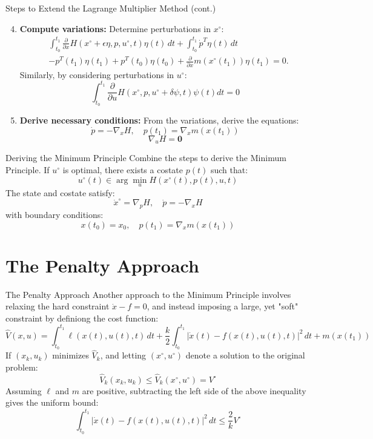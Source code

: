 \documentclass[10pt]{beamer}
\begin{document}
\begin{frame}{Steps to Extend the Lagrange Multiplier Method (cont.)}
  \begin{enumerate}
    \setcounter{enumi}{3}
    \item \textbf{Compute variations:} Determine perturbations in \(x^{\circ}\):
    \[
    \begin{aligned}
      &\int_{t_0}^{t_1} \frac{\partial}{\partial x} H(x^\circ + \epsilon \eta, p, u^\circ, t) \eta(t) \, dt + \int_{t_0}^{t_1} \dot{p}^T \eta(t) \, dt \\
      &- p^T(t_1) \eta(t_1) + p^T(t_0) \eta(t_0) + \frac{\partial}{\partial x} m(x^\circ(t_1)) \eta(t_1) = 0.
    \end{aligned}
    \]
    Similarly, by considering perturbations in \( u^{\circ} \):
    \[
       \int_{t_0}^{t_1}\frac{\partial}{\partial u}H(x^{\circ},p,u^{\circ}+\delta \psi,t)\psi(t)dt=0
    \]
    \item \textbf{Derive necessary conditions:} From the variations, derive the equations:
    \[
    \dot{p} = -\nabla_x H, \quad p(t_1) = \nabla_x m(x(t_1))
    \]
    \[
    \nabla_u H = \mathbf{0}
    \]
\end{enumerate}
\end{frame}

\begin{frame}{Deriving the Minimum Principle}
  Combine the steps to derive the Minimum Principle. If \( u^\circ \) is optimal, there exists a costate \( p(t) \) such that:
  \[
  u^\circ(t) \in \arg \min_u H(x^\circ(t), p(t), u, t)
  \]
  The state and costate satisfy:
  \[
  \dot{x}^\circ = \nabla_p H, \quad \dot{p} = -\nabla_x H
  \]
  with boundary conditions:
  \[
  x(t_0) = x_0, \quad p(t_1) = \nabla_x m(x(t_1))
  \]
\end{frame}
  
\section{The Penalty Approach}
  
\begin{frame}[fragile]{The Penalty Approach}
  Another approach to the Minimum Principle involves relaxing the hard constraint \( \dot{x} - f = 0 \), and instead imposing a large, yet "soft" constraint by  definiong the cost function:
  \[
  \hat{V}(x, u) = \int_{t_0}^{t_1} \ell(x(t), u(t), t) \, dt + \frac{k}{2} \int_{t_0}^{t_1} |\dot{x}(t) - f(x(t), u(t), t)|^2 \, dt + m(x(t_1))
  \]
  If \( (x_k, u_k) \) minimizes \( \hat{V}_k \), and letting \( (x^\circ, u^\circ) \) denote a solution to the original problem:
  \[
  \hat{V}_k(x_k, u_k) \leq \hat{V}_k(x^\circ, u^\circ) = V^\circ
  \]
  Assuming \( \ell \) and \( m \) are positive, subtracting the left side of the above inequality gives the uniform bound:
  \[
  \int_{t_0}^{t_1} |\dot{x}(t) - f(x(t), u(t), t)|^2 \, dt \leq \frac{2}{k} V^\circ
  \]
\end{frame}
  
\end{document}
